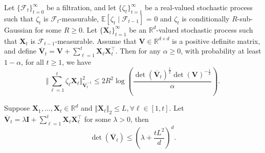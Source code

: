 \begin{lemma}
\label{lemma: self_norm_bound}
Let $\{\mathcal{F}_t\}_{t=0}^{\infty}$ be a filtration, and let $\{\zeta_t\}_{t=1}^{\infty}$ be a real-valued stochastic process such that $\zeta_t$ is $\mathcal{F}_t$-measurable, $\mathbb{E}[\zeta_t \mid \mathcal{F}_{t-1}]$ = 0 and $\zeta_t$ is conditionally $R$-sub-Gaussian for some $R \geq 0$.
Let $\{\boldsymbol{X}_t\}_{t=1}^{\infty}$ be an $\mathbb{R}^d$-valued stochastic process such that $\boldsymbol{X}_t$ is $\mathcal{F}_{t-1}$-measurable. 
Assume that $\boldsymbol{V} \in \mathbb{R}^{d \times d}$ is a positive definite matrix, and define $\boldsymbol{\overline{V}}_{t} = \boldsymbol{V} + \sum_{\ell=1}^{t} \boldsymbol{X}_{\ell} \boldsymbol{X}_{\ell}^{\top}$.
Then for any $\alpha \geq 0$, with probability at least $1 - \alpha$, for all $t \geq 1$, we have
\[
\Vert \sum_{\ell=1}^{t} \zeta_{\ell} \boldsymbol{X}_{\ell} \Vert_{\boldsymbol{\overline{V}}_{t}^{-1}}^2
\leq
2R^2 \log \left( \frac{ \det \left( \boldsymbol{\overline{V}}_{t} \right)^{\frac{1}{2}} \det \left( \boldsymbol{V} \right)^{-\frac{1}{2}} }{\alpha} \right).
\]
\end{lemma}

\begin{lemma}
\label{lemma: det_trace_ineq}
Suppose $\boldsymbol{X}_{1}, ... , \boldsymbol{X}_{t} \in \mathbb{R}^d$ and $\Vert \boldsymbol{X}_{\ell} \Vert_2 \leq L, \forall \ell \in [1,t]$. 
Let $\boldsymbol{\overline{V}}_{t} = \lambda \boldsymbol{I} + \sum_{\ell=1}^{t} \boldsymbol{X}_{\ell} \boldsymbol{X}_{\ell}^{\top}$ for some $\lambda > 0$, then
\[
\det \left( \boldsymbol{\overline{V}}_t \right) \leq \left(\lambda + \frac{t L^2}{d} \right)^d.
\]
\end{lemma}


